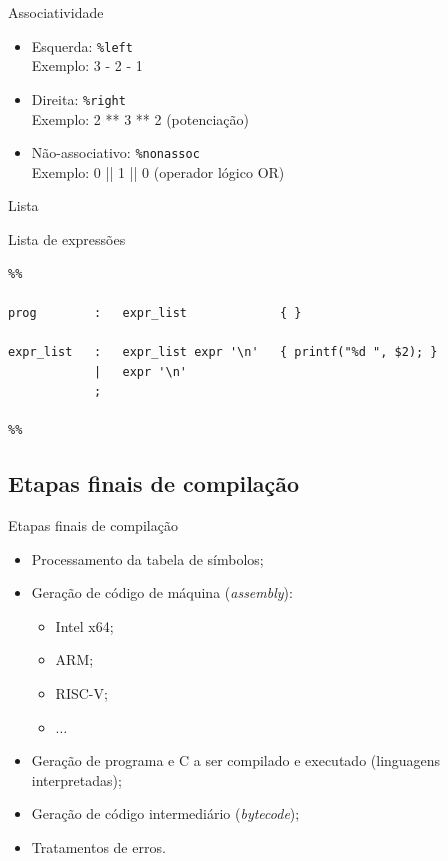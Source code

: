 \begin{frame}{Associatividade}

  \begin{itemize}
    \item Esquerda: {\tt \%left}\\
      Exemplo: 3 - 2 - 1
     \bigskip
    \item Direita:  {\tt \%right}\\
     Exemplo: 2  ** 3 ** 2 \hfil (potenciação)
     \bigskip
    \item Não-associativo: {\tt \%nonassoc}\\
      Exemplo: 0 || 1 || 0  \hfil (operador lógico OR)
  \end{itemize}
\end{frame}

\begin{frame}[fragile]{Lista}

  Lista de expressões

 \begin{lstlisting}
%%

prog        :   expr_list             { }

expr_list   :   expr_list expr '\n'   { printf("%d ", $2); }
            |   expr '\n' 
            ;

%%
\end{lstlisting}
\end{frame}
 

\subsection{Etapas finais de compilação}
\frame{\tableofcontents[currentsubsection]}

\begin{frame}{Etapas finais de compilação}

  \begin{itemize}
  \item Processamento da tabela de símbolos;
  \item Geração de código de máquina ({\it assembly}):
    \begin{itemize}
    \item Intel x64;
    \item ARM;
    \item RISC-V;
    \item $\ldots$
    \end{itemize}
  \item Geração de programa e C a ser compilado e executado
    (linguagens interpretadas);
  \item Geração de código intermediário ({\it bytecode});
  \item Tratamentos de erros.
  \end{itemize}
\end{frame}

